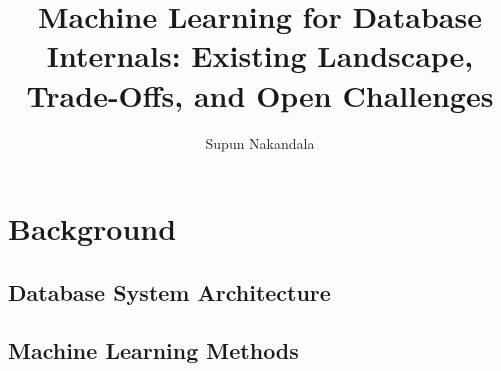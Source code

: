 \documentclass[acmsmall]{acmart}
\newcommand{\titlename}{Machine Learning for Database Internals: Existing Landscape, Trade-Offs, and Open Challenges}
\begin{document}
\sloppy
\title{\titlename}


\author{Supun Nakandala}

\maketitle
\begin{abstract}
\end{abstract}



\section{Background}
\subsection{Database System Architecture}
\subsection{Machine Learning Methods}










\end{document}
